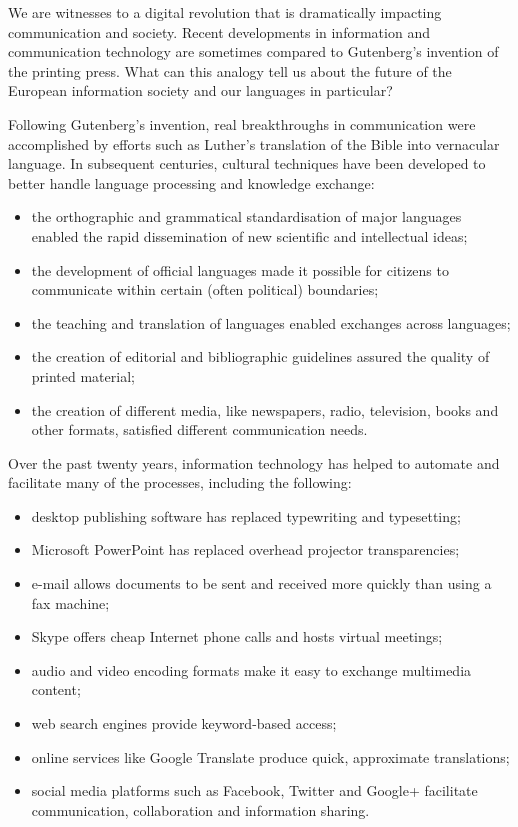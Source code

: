 \begin{multicols}{2}
We are witnesses to a digital revolution that is dramatically impacting communication and society. Recent developments in information and communication technology are sometimes compared to Gutenberg’s invention of the printing press. What can this analogy tell us about the future of the European information society and our languages in particular?


Following Gutenberg’s invention, real breakthroughs in communication were accomplished by efforts such as Luther’s translation of the Bible into vernacular language. In subsequent centuries, cultural techniques have been developed to better handle language processing and knowledge exchange:

\begin{itemize}
\item the orthographic and grammatical standardisation of major languages enabled the rapid dissemination of new scientific and intellectual ideas;
\item the development of official languages made it possible for citizens to communicate within certain (often political) boundaries;
\item the teaching and translation of languages enabled exchanges across languages;
\item the creation of editorial and bibliographic guidelines assured the quality of printed material;
\item the creation of different media, like newspapers, radio, television, books and other formats, satisfied different communication needs.
\end{itemize}

Over the past twenty years, information technology has helped to automate and facilitate many of the processes, including the following:

\begin{itemize}
\item desktop publishing software has replaced typewriting and typesetting;
\item Microsoft PowerPoint has replaced overhead projector transparencies;
\item e-mail allows documents to be sent and received more quickly than using a fax machine;
\item Skype offers cheap Internet phone calls and hosts virtual meetings;
\item audio and video encoding formats make it easy to exchange multimedia content;
\item web search engines provide keyword-based access;
\item online services like Google Translate produce quick, approximate translations;
\item social media platforms such as Facebook, Twitter and Google+ facilitate communication, collaboration and information sharing. 
\end{itemize}


\end{multicols}
